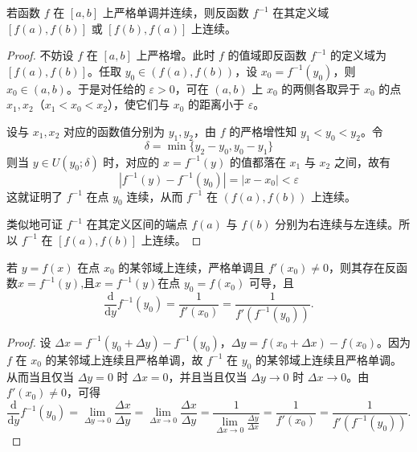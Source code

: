 \documentclass[../../main.tex]{subfiles}%
\begin{document}
\begin{theorem}[反函数连续定理]\label{theorem:反函数连续定理}
若函数 \( f \) 在 \([a, b]\) 上严格单调并连续，则反函数 \( f^{-1} \) 在其定义域 \([f(a), f(b)]\) 或 \([f(b), f(a)]\) 上连续。
\end{theorem}
\begin{proof}

不妨设 \( f \) 在 \([a, b]\) 上严格增。此时 \( f \) 的值域即反函数 \( f^{-1} \) 的定义域为 \([f(a), f(b)]\)。任取 \( y_0 \in (f(a), f(b)) \)，设 \( x_0 = f^{-1}(y_0) \)，则 \( x_0 \in (a, b) \)。于是对任给的 \( \varepsilon > 0 \)，可在 \( (a, b) \) 上 \( x_0 \) 的两侧各取异于 \( x_0 \) 的点 \( x_1, x_2 \)（\( x_1 < x_0 < x_2 \)），使它们与 \( x_0 \) 的距离小于 \( \varepsilon \)。

设与 \( x_1, x_2 \) 对应的函数值分别为 \( y_1, y_2 \)，由 \( f \) 的严格增性知 \( y_1 < y_0 < y_2 \)。令
\[
\delta = \min\{ y_2 - y_0, y_0 - y_1 \}
\]
则当 \( y \in U(y_0; \delta) \) 时，对应的 \( x = f^{-1}(y) \) 的值都落在 \( x_1 \) 与 \( x_2 \) 之间，故有
\[
| f^{-1}(y) - f^{-1}(y_0) | = | x - x_0 | < \varepsilon
\]
这就证明了 \( f^{-1} \) 在点 \( y_0 \) 连续，从而 \( f^{-1} \) 在 \( (f(a), f(b)) \) 上连续。

类似地可证 \( f^{-1} \) 在其定义区间的端点 \( f(a) \) 与 \( f(b) \) 分别为右连续与左连续。所以 \( f^{-1} \) 在 \([f(a), f(b)]\) 上连续。

\end{proof}

\begin{theorem}[反函数求导定理]\label{theorem:反函数求导定理}
若 \( y=f(x) \) 在点 \( x_0 \) 的某邻域上连续，严格单调且 \( f'(x_0) \neq 0 \)，则其存在反函数$x=f^{-1}(y)$,且$x=f^{-1}(y)$在点 \(y_0=f(x_0) \) 可导，且
\[
\frac{\mathrm{d}}{\mathrm{d}y}f^{-1}\left( y_0 \right) =\frac{1}{f' \left( x_0 \right)}=\frac{1}{f' \left( f^{-1}\left( y_0 \right) \right)}.
\]
\end{theorem}
\begin{proof}

设 \( \Delta x = f^{-1}(y_0 + \Delta y) - f^{-1}(y_0) \)，\( \Delta y = f(x_0 + \Delta x) - f(x_0) \)。因为 \(f \) 在 \( x_0 \) 的某邻域上连续且严格单调，故 \( f^{-1}\) 在 \( y_0 \) 的某邻域上连续且严格单调。从而当且仅当 \( \Delta y = 0 \) 时 \( \Delta x = 0 \)，并且当且仅当 \( \Delta y \to 0 \) 时 \( \Delta x \to 0 \)。由 \( f'(x_0) \neq 0 \)，可得
\[
\frac{\mathrm{d}}{\mathrm{d}y}f^{-1}\left( y_0 \right) =\lim_{\Delta y\rightarrow 0} \frac{\Delta x}{\Delta y}=\lim_{\Delta x\rightarrow 0} \frac{\Delta x}{\Delta y}=\frac{1}{\lim\limits_{\Delta x\rightarrow 0} \frac{\Delta y}{\Delta x}}=\frac{1}{f' \left( x_0 \right)}=\frac{1}{f' \left( f^{-1}\left( y_0 \right) \right)}.
\]

\end{proof}
\end{document}
